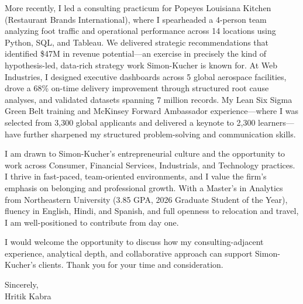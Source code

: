 \documentclass[letterpaper,11pt]{article}
\begin{document}
More recently, I led a consulting practicum for Popeyes Louisiana Kitchen (Restaurant Brands International), where I spearheaded a 4-person team analyzing foot traffic and operational performance across 14 locations using Python, SQL, and Tableau. We delivered strategic recommendations that identified \$47M in revenue potential---an exercise in precisely the kind of hypothesis-led, data-rich strategy work Simon-Kucher is known for. At Web Industries, I designed executive dashboards across 5 global aerospace facilities, drove a 68\% on-time delivery improvement through structured root cause analyses, and validated datasets spanning 7 million records. My Lean Six Sigma Green Belt training and McKinsey Forward Ambassador experience---where I was selected from 3,300 global applicants and delivered a keynote to 2,300 learners---have further sharpened my structured problem-solving and communication skills.

I am drawn to Simon-Kucher's entrepreneurial culture and the opportunity to work across Consumer, Financial Services, Industrials, and Technology practices. I thrive in fast-paced, team-oriented environments, and I value the firm's emphasis on belonging and professional growth. With a Master's in Analytics from Northeastern University (3.85 GPA, 2026 Graduate Student of the Year), fluency in English, Hindi, and Spanish, and full openness to relocation and travel, I am well-positioned to contribute from day one.

I would welcome the opportunity to discuss how my consulting-adjacent experience, analytical depth, and collaborative approach can support Simon-Kucher's clients. Thank you for your time and consideration.

\vspace{4pt}

Sincerely,\\
Hritik Kabra
\end{document}
